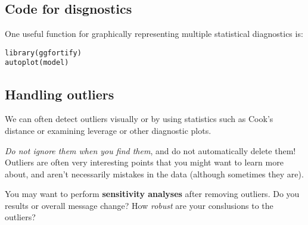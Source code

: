 \documentclass[titlepage, 12pt, leqno]{article}
\begin{document}
\subsection{Code for disgnostics}
One useful function for graphically representing multiple statistical diagnostics
is:
\begin{verbatim}
library(ggfortify)
autoplot(model)
\end{verbatim}

\subsection{Handling outliers}
We can often detect outliers visually or by using statistics such as Cook's 
distance or examining leverage or other diagnostic plots.

\textit{Do not ignore them when you find them}, and do not automatically
delete them! Outliers are often very interesting points that you might want to
learn more about, and aren't necessarily mistakes in the data (although
sometimes they are).

You may want to perform \textbf{sensitivity analyses} after removing outliers.
Do you results or overall message change? How \textit{robust} are your
conslusions to the outliers?
\end{document}
